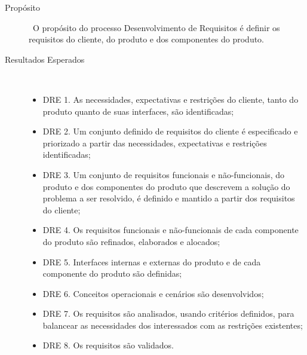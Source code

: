   \begin{description}
    \item [Propósito] \
     O propósito do processo Desenvolvimento de Requisitos é definir os requisitos
     do cliente, do produto e dos componentes do produto.
    \item [Resultados Esperados]\
      \begin{itemize}
        \item DRE 1. As necessidades, expectativas e restrições do cliente, tanto do produto
              quanto de suas interfaces, são identificadas;
        \item DRE 2. Um conjunto definido de requisitos do cliente é especificado e priorizado
              a partir das necessidades, expectativas e restrições identificadas;
        \item DRE 3. Um conjunto de requisitos funcionais e não-funcionais, do produto e dos componentes
                    do produto que descrevem a solução do problema a ser resolvido, é definido e mantido
                    a partir dos requisitos do cliente;
        \item DRE 4. Os requisitos funcionais e não-funcionais de cada componente do produto são
              refinados, elaborados e alocados;
        \item DRE 5. Interfaces internas e externas do produto e de cada componente do produto são
              definidas;
        \item DRE 6. Conceitos operacionais e cenários são desenvolvidos;
        \item DRE 7. Os requisitos são analisados, usando critérios definidos, para balancear
              as necessidades dos interessados com as restrições existentes;
        \item DRE 8. Os requisitos são validados.
      \end{itemize}
  \end{description}

